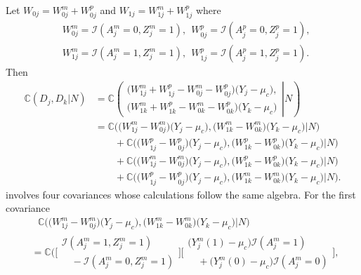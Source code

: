 \documentclass[12pt]{extarticle}
\newcommand{\indicator}{\mathcal{I}}
\newcommand{\cV}{\mathbb{C}}
\begin{document}
{Let $W_{0j}=W^m_{0j}+W^p_{0j}$ and $W_{1j}=W^m_{1j}+W^p_{1j}$ where 
\begin{align*}& W^m_{0j} = \indicator(A^m_j=0,Z^m_j=1),  \ \ W^p_{0j} = \indicator(A^p_j=0,Z^p_j=1), \nonumber \\ 
& W^m_{1j} = \indicator(A^m_j=1,Z^m_j=1),  \ \ W^p_{1j} = \indicator(A^p_j=1,Z^p_j=1).
\end{align*} Then 
\begin{align}
\cV(D_j,D_k|N) &= \cV \left( \left. \begin{array}{l}
                          \big(W^m_{1j}+W^p_{1j}-W^m_{0j}-W^p_{0j}\big)\big(Y_j-\mu_c\big), \\
                          \big(W^m_{1k}+W^p_{1k}-W^m_{0k}-W^p_{0k}\big)\big(Y_k-\mu_c\big)
                          \end{array} \right| N \right) \nonumber \\
&= \cV\Big(\big(W_{1j}^m-W_{0j}^m\big)\big(Y_j-\mu_c\big),\big(W_{1k}^m-W_{0k}^m\big)\big(Y_k-\mu_c\big)\Big|N\Big) \nonumber \\
& \qquad + \cV\Big(\big(W_{1j}^p-W_{0j}^p\big)\big(Y_j-\mu_c\big),\big(W_{1k}^p-W_{0k}^p\big)\big(Y_k-\mu_c\big)\Big|N\Big) \nonumber \\
& \qquad + \cV\Big(\big(W_{1j}^m-W_{0j}^m\big)\big(Y_j-\mu_c\big),\big(W_{1k}^p-W_{0k}^p\big)\big(Y_k-\mu_c\big)\Big|N\Big) \nonumber \\
& \qquad + \cV\Big(\big(W_{1j}^p-W_{0j}^p\big)\big(Y_j-\mu_c\big),\big(W_{1k}^m-W_{0k}^m\big)\big(Y_k-\mu_c\big)\Big|N\Big). \tag{A8.a} \label{eq:e1}
\end{align} 
 involves four covariances whose calculations follow the same algebra. For the first covariance 
{\allowdisplaybreaks 
\begin{align*}
&~~~ \cV\Big(\big(W_{1j}^m-W_{0j}^m\big)\big(Y_j-\mu_c\big),\big(W_{1k}^m-W_{0k}^m\big)\big(Y_k-\mu_c\big)\Big|N\Big) \nonumber \\
&= \cV\Big(\Big[ \begin{array}{l}
               \indicator(A^m_j=1,Z^m_j=1) \\
               \quad - \indicator(A^m_j=0,Z^m_j=1)
               \end{array}\Big] \Big[\begin{array}{l}
               \big(Y^m_j(1)-\mu_c\big)\indicator(A^m_j=1) \\
               \quad + \big(Y^m_j(0)-\mu_c\big)\indicator(A^m_j=0)
               \end{array}\Big] , ~ \nonumber \\

\end{align*}}}
\end{document}
